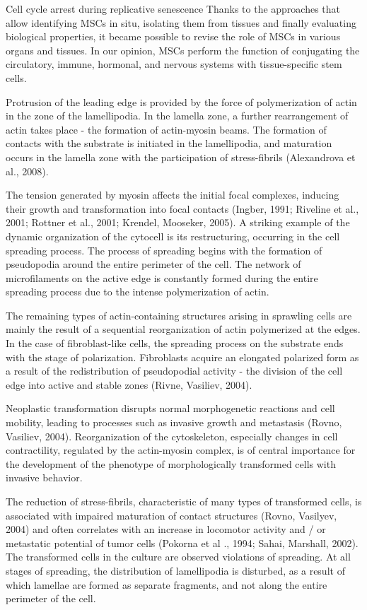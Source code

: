 \documentclass[alpha-refs]{wiley-article}
\begin{document}
Cell cycle arrest during replicative senescence
Thanks to the approaches that allow identifying MSCs in situ, isolating them from tissues and finally evaluating biological properties, it became possible to revise the role of MSCs in various organs and tissues.
In our opinion, MSCs perform the function of conjugating the circulatory, immune, hormonal, and nervous systems with tissue-specific stem cells.



Protrusion of the leading edge is provided by the force of polymerization of actin in the zone of the lamellipodia. In the lamella zone, a further rearrangement of actin takes place - the formation of actin-myosin beams.
The formation of contacts with the substrate is initiated in the lamellipodia, and maturation occurs in the lamella zone with the participation of stress-fibrils (Alexandrova et al., 2008).


The tension generated by myosin affects the initial focal complexes, inducing their growth and transformation into focal contacts (Ingber, 1991; Riveline et al., 2001; Rottner et al., 2001; Krendel, Mooseker, 2005).
A striking example of the dynamic organization of the cytocell is its restructuring, occurring in the cell spreading process.
The process of spreading begins with the formation of pseudopodia around the entire perimeter of the cell.
The network of microfilaments on the active edge is constantly formed during the entire spreading process due to the intense polymerization of actin.

The remaining types of actin-containing structures arising in sprawling cells are mainly the result of a sequential reorganization of actin polymerized at the edges.
In the case of fibroblast-like cells, the spreading process on the substrate ends with the stage of polarization. Fibroblasts acquire an elongated polarized form as a result of the redistribution of pseudopodial activity - the division of the cell edge into active and stable zones (Rivne, Vasiliev, 2004).

Neoplastic transformation disrupts normal morphogenetic reactions and cell mobility, leading to processes such as invasive growth and metastasis (Rovno, Vasiliev, 2004).
Reorganization of the cytoskeleton, especially changes in cell contractility, regulated by the actin-myosin complex, is of central importance for the development of the phenotype of morphologically transformed cells with invasive behavior.

The reduction of stress-fibrils, characteristic of many types of transformed cells, is associated with impaired maturation of contact structures (Rovno, Vasilyev, 2004) and often correlates with an increase in locomotor activity and / or metastatic potential of tumor cells (Pokorna et al ., 1994; Sahai, Marshall, 2002).
The transformed cells in the culture are observed violations of spreading.
At all stages of spreading, the distribution of lamellipodia is disturbed, as a result of which lamellae are formed as separate fragments, and not along the entire perimeter of the cell.
\end{document}

